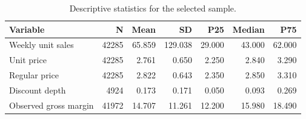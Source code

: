 \begin{table}
\caption{Descriptive statistics for the selected sample.}
\label{tab:descriptive_statistics}
\begin{tabular}{lrrrrrr}
\toprule
Variable & N & Mean & SD & P25 & Median & P75 \\
\midrule
Weekly unit sales & 42285 & 65.859 & 129.038 & 29.000 & 43.000 & 62.000 \\
Unit price & 42285 & 2.761 & 0.650 & 2.250 & 2.840 & 3.290 \\
Regular price & 42285 & 2.822 & 0.643 & 2.350 & 2.850 & 3.310 \\
Discount depth & 4924 & 0.173 & 0.171 & 0.050 & 0.093 & 0.269 \\
Observed gross margin & 41972 & 14.707 & 11.261 & 12.200 & 15.980 & 18.490 \\
\bottomrule
\end{tabular}
\end{table}
